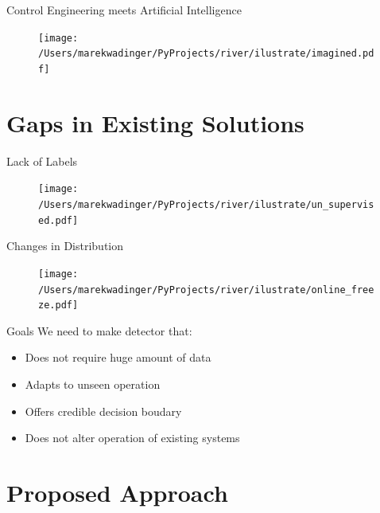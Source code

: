 \documentclass[aspectratio=169]{beamer}
\begin{document}
\begin{frame}{Control Engineering meets Artificial Intelligence}
    \begin{figure}[htpb]
        \begin{center}
            \texttt{[image: /Users/marekwadinger/PyProjects/river/ilustrate/imagined.pdf]}
        \end{center}
    \end{figure}
\end{frame}


\section{Gaps in Existing Solutions}

\begin{frame}{Lack of Labels}
    \begin{figure}[htpb]
        \begin{center}
            \texttt{[image: /Users/marekwadinger/PyProjects/river/ilustrate/un\_supervised.pdf]}
        \end{center}
    \end{figure}
\end{frame}

\begin{frame}{Changes in Distribution}
    \begin{figure}[htpb]
        \begin{center}
            \texttt{[image: /Users/marekwadinger/PyProjects/river/ilustrate/online\_freeze.pdf]}
        \end{center}
    \end{figure}
\end{frame}

\begin{frame}{Goals}
    We need to make detector that:
    \begin{itemize}
        \item Does not require huge amount of data
        \item Adapts to unseen operation
        \item Offers credible decision boudary
        \item Does not alter operation of existing systems
    \end{itemize}
\end{frame}


\section{Proposed Approach}
\end{document}
